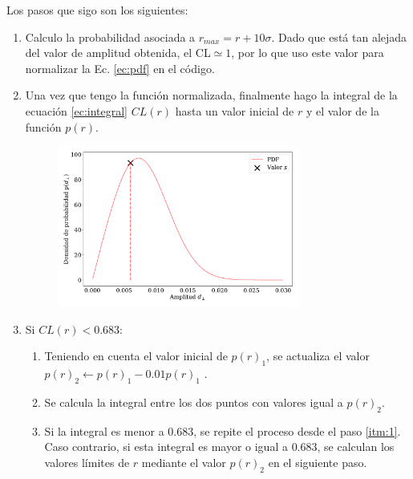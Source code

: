 \documentclass[11pt,papel,oneside,singlespace]{ibtesis}
\begin{document}
Los pasos que sigo son los siguientes: 

\begin{enumerate}
    \item Calculo la probabilidad asociada a $r_{max}=r +  10\sigma$. Dado que está tan alejada del valor de amplitud obtenida, el CL$\simeq 1$, por lo que uso este valor para normalizar  la Ec. \ref{ec:pdf} en el código.
    \item Una vez que tengo la función normalizada, finalmente hago la integral de la ecuación \ref{ec:integral} $CL(r)$ hasta un valor inicial de $r$ y el valor de la función $p(r)$.
    \begin{figure}[H]
        \begin{small}
            \begin{center}
                \includegraphics[width=0.75\textwidth]{bessel_prob_value_s.pdf}
            \end{center}
            \caption{}
        \end{small}
    \end{figure}
    \item Si $CL(r)< 0.683$:
    \begin{enumerate}
        \item Teniendo en cuenta el valor inicial de $p(r)_1$, se actualiza el valor  $p(r)_2 \leftarrow p(r)_1 - 0.01 p(r)_1$ \label{itm:1}.
        \item Se calcula la integral entre los dos puntos con valores igual a $p(r)_2$. 
        \item \label{itm:3} Si la integral es menor a $0.683$, se repite el proceso desde el paso \ref{itm:1}. Caso contrario, si esta integral es mayor o igual a $0.683$, se calculan los valores límites de $r$ mediante el valor $p(r)_2$ en el siguiente paso. 


\end{enumerate}
\end{enumerate}
\end{document}
